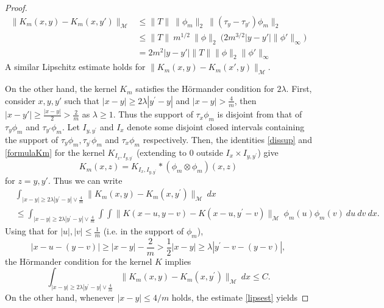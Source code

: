 \documentclass[psamsfonts]{amsart}
\begin{document}
\begin{proof}
\begin{align}
  \nonumber \| K_m(x,y)-K_m(x,y')\|_\mathcal M&\leq                                           \|T\|  \ \| \phi_m\|_{2} \ \| (\tau_y-\tau_{y'})\phi_m\|_2 \\ \nonumber 
  &\leq \|T\| \ m^{1/2} \ \|\phi\|_2 \ \big( 2 m^{3/2}  {|y-y'|} \|\phi'\|_{\infty}\big)\\ \label{lipsest} & =
2  m^2 {|y-y'|} \|T\| \|\phi\|_2 \|\phi'\|_{\infty}
\end{align}
A similar Lipschitz estimate holds for $\| K_m(x,y)-K_m(x',y)\|_\mathcal M$. 
      
On the other hand, the kernel $K_m$ satisfies the Hörmander condition for $2\lambda$. First, consider $x,y,y'$ such that $|x-y| \geq 2\lambda |y^\prime - y|$
and $|x-y| > \frac{4}{m}$, then $|x-y'|\geq \frac{|x-y|}2>\frac 2 m$ as $\lambda\geq 1$. Thus the support of $\tau_x {\phi}_m$ is
disjoint from that of $\tau_y \phi_m$ and $\tau_{y'} \phi_m$. Let
$I_{y,y^\prime}$ and $I_x$ denote some disjoint closed intervals containing
the support of $\tau_y \phi_m,\tau_{y^\prime}\phi_m$ and
$\tau_x {\phi}_m$ respectively. Then, the identities \eqref{dissup} and \eqref{formulaKm} for the kernel
$K_{I_x,I_{y,y^\prime}}$ (extending to 0 outside $I_x\times I_{y,y^\prime}$) give
$$ K_m(x,z)= K_{I_x,I_{y,y^\prime}}*({\phi}_m\otimes \phi_m)(x,z)$$
for $z=y,y'$. Thus we can write
        \begin{align*}
            &\int_{|x-y| \geq 2\lambda |y^\prime - y|\vee \frac{4}{ m} } \|K_m(x,y)-K_m(x,y^\prime)\|_{\mathcal{M}} \ dx \\
            &\leq\int_{|x-y| \geq 2\lambda |y^\prime -y|\vee \frac{4}{m} } \int \int \big\| {K}(x - u,y -{v}) - {K}(x - {u},y^\prime - {v}) \big\|_{\mathcal{M}} \ {\phi_m}(u) \phi_m(v)\ du \ dv \ dx.
        \end{align*}
        Using that for $|u|,|v|\leq \frac{1}{m}$ (i.e. in the support of $\phi_m$), 
$$|x - u - (y -{v}) | \geq |x-y| - \frac{2}{m} > \frac{1}{2} |x-y| \geq \lambda |y^\prime-v -(y-v)|,$$
the H\"ormander condition for the kernel $K$ implies
    $$\int_{|x-y| \geq 2\lambda |y^\prime - y|\vee \frac{4}{ m}} \|K_m(x,y)-K_m(x,y^\prime)\|_{\mathcal{M}} \ dx \leq C.$$ 
    On the other hand, whenever $|x -y | \leq 4/ m$ holds, the estimate \eqref{lipsest} yields

\end{proof}
\end{document}
